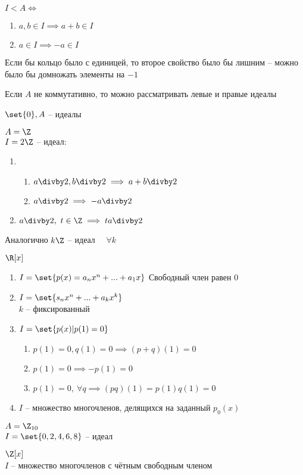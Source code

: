 \begin{remark}
	$ I < A \iff $
	\begin{enumerate}
		\item $ a, b \in I \implies a + b \in I $
		\item $ a \in I \implies -a \in I $
	\end{enumerate}
\end{remark}

\begin{remark}
	Если бы кольцо было с единицей, то второе свойство было бы лишним -- можно было бы домножать элементы на $ -1 $
\end{remark}

\begin{remark}
	Если $ A $ не коммутативно, то можно рассматривать левые и правые идеалы
\end{remark}

\begin{exmpls}
	\item $ \set{0}, A $ -- идеалы
	\item $ A = \Z $ \\
	$ I = 2\Z $ -- идеал:
	\begin{enumerate}
		\item
		\begin{enumerate}
			\item $ a \divby 2, b \divby 2 \implies a + b \divby 2 $
			\item $ a \divby 2 \implies -a \divby 2 $
		\end{enumerate}
		\item $ a \divby 2, ~ t \in \Z \implies ta \divby 2 $
	\end{enumerate}
	Аналогично $ k\Z $ -- идеал $ \quad \forall k $
	\item $ \R[x] $
	\begin{enumerate}
		\item $ I = \set{p(x) = a_nx^n + ... + a_1x} $
		Свободный член равен 0
		\item $ I = \set{s_nx^n + ... + a_kx^k} $ \\
		$ k $ -- фиксированный
		\item $ I = \set{p(x) | p(1) = 0} $
		\begin{enumerate}
			\item $ p(1) = 0, q(1) = 0 \implies (p + q)(1) = 0 $
			\item $ p(1) = 0 \implies -p(1) = 0 $
			\item $ p(1) = 0, ~ \forall q \implies (pq)(1) = p(1)q(1) = 0 $
		\end{enumerate}
		\item $ I $ -- множество многочленов, делящихся на заданный $ p_0(x) $
	\end{enumerate}
	\item $ A = \Z_{10} $ \\
	$ I = \set{0, 2, 4, 6, 8} $ -- идеал
	\item $ \Z[x] $ \\
	$ I $ -- множество многочленов с чётным свободным членом
\end{exmpls}

